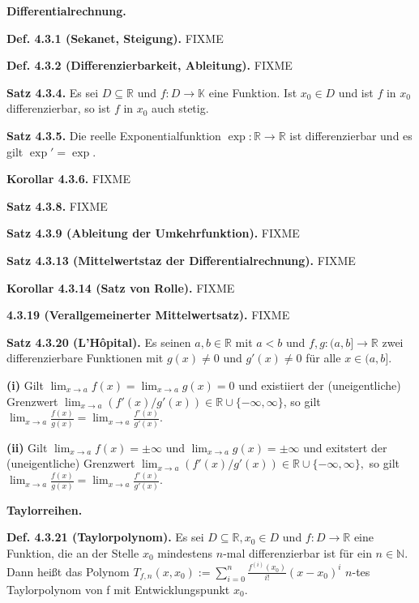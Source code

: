 \textbf{Differentialrechnung.}

\textbf{Def. 4.3.1 (Sekanet, Steigung).} FIXME

\textbf{Def. 4.3.2 (Differenzierbarkeit, Ableitung).} FIXME

\textbf{Satz 4.3.4.} Es sei $D \subseteq \mathbb R$ und $f : D \rightarrow \mathbb K$ eine Funktion. Ist $x_0 \in D$ und ist $f$ in $x_0$ differenzierbar, so ist $f$ in $x_0$ auch stetig.

\textbf{Satz 4.3.5.} Die reelle Exponentialfunktion $\exp : \mathbb R \rightarrow \mathbb R$ ist differenzierbar und es gilt $\exp' = \exp$.

\textbf{Korollar 4.3.6.} FIXME

\textbf{Satz 4.3.8.} FIXME

\textbf{Satz 4.3.9 (Ableitung der Umkehrfunktion).} FIXME

\textbf{Satz 4.3.13 (Mittelwertstaz der Differentialrechnung).} FIXME

\textbf{Korollar 4.3.14 (Satz von Rolle).} FIXME

\textbf{4.3.19 (Verallgemeinerter Mittelwertsatz).} FIXME

\textbf{Satz 4.3.20 (L'Hôpital).} Es seinen $a,b\in\mathbb{R}$ mit
$a<b$ und $f,g:(a,b]\rightarrow\mathbb{R}$ zwei differenzierbare
Funktionen mit $g(x)\not=0$ und $g'(x)\not=0$ für alle $x\in(a,b]$.

\textbf{(i)} Gilt $\lim_{x\rightarrow a}f(x)=\lim_{x\rightarrow a}g(x)=0$
und existiiert der (uneigentliche) Grenzwert $\lim_{x\rightarrow a}(f'(x)/g'(x))\in\mathbb{R}\cup\{-\infty,\infty\}$,
so gilt $\lim_{x\rightarrow a}\frac{f(x)}{g(x)}=\lim_{x\rightarrow a}\frac{f'(x)}{g'(x)}$.

\textbf{(ii)} Gilt $\lim_{x\rightarrow a}f(x)=\pm\infty$ und $\lim_{x\rightarrow a}g(x)=\pm\infty$
und exitstert der (uneigentliche) Grenzwert $\lim_{x\rightarrow a}(f'(x)/g'(x))\in\mathbb{R}\cup\{-\infty,\infty\},$
so gilt $\lim_{x\rightarrow a}\frac{f(x)}{g(x)}=\lim_{x\rightarrow a}\frac{f'(x)}{g'(x)}$.

\textbf{Taylorreihen.}

\textbf{Def. 4.3.21 (Taylorpolynom).} Es sei $D\subseteq\mathbb{R},x_{0}\in D$
und $f:D\rightarrow\mathbb{R}$ eine Funktion, die an der Stelle $x_{0}$
mindestens $n$-mal differenzierbar ist für ein $n\in\mathbb{N}.$
Dann heißt das Polynom $T_{f,n}(x,x_{0}):=\sum_{i=0}^{n}\frac{f^{(i)}(x_{0})}{i!}(x-x_{0})^{i}$
$n$-tes Taylorpolynom von f mit Entwicklungspunkt $x_{0}$.

